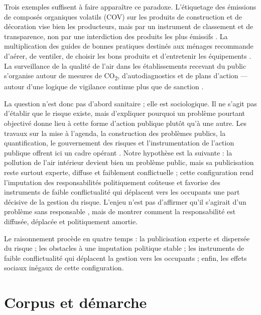 \documentclass[a4paper,12pt,twoside]{book}
\begin{document}
Trois exemples suffisent à faire apparaître ce paradoxe. L'étiquetage des émissions de composés organiques volatils (COV) sur les produits de construction et de décoration vise bien les producteurs, mais par un instrument de classement et de transparence, non par une interdiction des produits les plus émissifs \parencite{Decret2011COV,Arrete2011COV,MinistereEcologieEtiquetageCOV2025}. La multiplication des guides de bonnes pratiques destinés aux ménages recommande d'aérer, de ventiler, de choisir les bons produits et d'entretenir les équipements \parencite{ADEME2024AirSainChezSoi,ADEME2023BienVentiler}. La surveillance de la qualité de l'air dans les établissements recevant du public s'organise autour de mesures de CO\textsubscript{2}, d'autodiagnostics et de plans d'action --- autour d'une logique de vigilance continue plus que de sanction \parencite{Decret2022ERP,HCSP2022CO2ERP}.

La question n'est donc pas d'abord sanitaire ; elle est sociologique. Il ne s'agit pas d'établir que le risque existe, mais d'expliquer pourquoi un problème pourtant objectivé donne lieu à cette forme d'action publique plutôt qu'à une autre. Les travaux sur la mise à l'agenda, la construction des problèmes publics, la quantification, le gouvernement des risques et l'instrumentation de l'action publique offrent ici un cadre opérant \parencite{Kingdon1984Agendas,ChailleuxZittoun2021GazSchiste,Ogien2010ValeurSocialeChiffre,Gusfield1981CulturePublicProblems,Borraz2008PolitiquesRisque,LascoumesLeGales2004GouvernerParLesInstruments}. Notre hypothèse est la suivante : la pollution de l'air intérieur devient bien un problème public, mais sa publicisation reste surtout experte, diffuse et faiblement conflictuelle ; cette configuration rend l'imputation des responsabilités politiquement coûteuse et favorise des instruments de faible conflictualité qui déplacent vers les occupants une part décisive de la gestion du risque. L'enjeu n'est pas d'affirmer qu'il s'agirait d'un problème \og sans responsable \fg, mais de montrer comment la responsabilité est diffusée, déplacée et politiquement amortie.

Le raisonnement procède en quatre temps : la publicisation experte et dispersée du risque ; les obstacles à une imputation politique stable ; les instruments de faible conflictualité qui déplacent la gestion vers les occupants ; enfin, les effets sociaux inégaux de cette configuration.

\section{Corpus et démarche}
\end{document}
